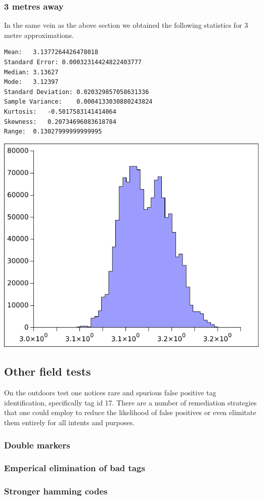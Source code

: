 \subsubsection{3 metres away}
In the same vein as the above section we obtained the following statistics for 3 metre approximations.
\begin{verbatim}
Mean:	3.1377264426478018
Standard Error:	0.00032314424822403777
Median:	3.13627
Mode:	3.12397
Standard Deviation:	0.020329857058631336
Sample Variance:	0.0004133030880243824
Kurtosis:	-0.5017583141414064
Skewness:	0.20734696083618784
Range:	0.13027999999999995
\end{verbatim}
\par
\includegraphics[]{machine_vision/data/3metres.pdf}
\subsection{Other field tests}
On the outdoors test one notices rare and spurious false positive tag identification, specifically tag id 17. There are a number of remediation strategies that one could employ to reduce the likelihood of false positives or even elimitate them entirely for all intents and purposes.
\subsubsection{Double markers}
\subsubsection{Emperical elimination of bad tags}
\subsubsection{Stronger hamming codes}
